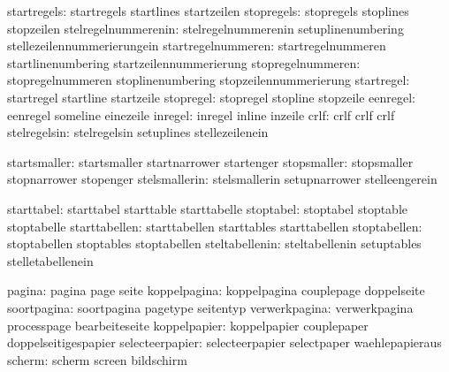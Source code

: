                   startregels:  startregels                  startlines
                                startzeilen
                   stopregels:  stopregels                   stoplines
                                stopzeilen
          stelregelnummerenin:  stelregelnummerenin          setuplinenumbering
                                stellezeilennummerierungein
           startregelnummeren:  startregelnummeren           startlinenumbering
                                startzeilennummerierung
            stopregelnummeren:  stopregelnummeren            stoplinenumbering
                                stopzeilennummerierung
                   startregel:  startregel                   startline
                                startzeile
                    stopregel:  stopregel                    stopline
                                stopzeile
                     eenregel:  eenregel                     someline
                                einezeile
                      inregel:  inregel                      inline
                                inzeile
                         crlf:  crlf                         crlf
                                crlf
                 stelregelsin:  stelregelsin                 setuplines
                                stellezeilenein

                 startsmaller:  startsmaller                 startnarrower
                                startenger
                  stopsmaller:  stopsmaller                  stopnarrower
                                stopenger
                stelsmallerin:  stelsmallerin                setupnarrower
                                stelleengerein

                   starttabel:  starttabel                   starttable
                                starttabelle
                    stoptabel:  stoptabel                    stoptable
                                stoptabelle
                starttabellen:  starttabellen                starttables
                                starttabellen                
                 stoptabellen:  stoptabellen                 stoptables
                                stoptabellen                 
               steltabellenin:  steltabellenin               setuptables
                                stelletabellenein

                       pagina:  pagina                       page
                                seite
                 koppelpagina:  koppelpagina                 couplepage
                                doppelseite
                  soortpagina:  soortpagina                  pagetype
                                seitentyp
                verwerkpagina:  verwerkpagina                processpage
                                bearbeiteseite
                 koppelpapier:  koppelpapier                 couplepaper
                                doppelseitigespapier
              selecteerpapier:  selecteerpapier              selectpaper
                                waehlepapieraus
                       scherm:  scherm                       screen
                                bildschirm

